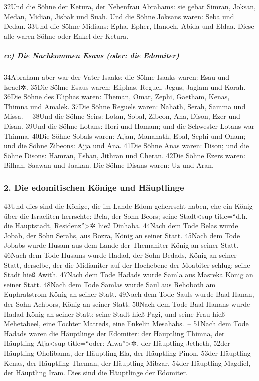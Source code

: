 32Und die Söhne der Ketura, der Nebenfrau Abrahams: sie gebar Simran,
Joksan, Medan, Midian, Jisbak und Suah. Und die Söhne Joksans waren:
Seba und Dedan. 33Und die Söhne Midians: Epha, Epher, Hanoch, Abida und
Eldaa. Diese alle waren Söhne oder Enkel der Ketura.

\hypertarget{cc-die-nachkommen-esaus-oder-die-edomiter}{%
\subparagraph{cc) Die Nachkommen Esaus (oder: die
Edomiter)}\label{cc-die-nachkommen-esaus-oder-die-edomiter}}

34Abraham aber war der Vater Isaaks; die Söhne Isaaks waren: Esau und
Israel✲. 35Die Söhne Esaus waren: Eliphas, Reguel, Jegus, Jaglam und
Korah. 36Die Söhne des Eliphas waren: Theman, Omar, Zephi, Gaetham,
Kenas, Thimna und Amalek. 37Die Söhne Reguels waren: Nahath, Serah,
Samma und Missa.~-- 38Und die Söhne Seirs: Lotan, Sobal, Zibeon, Ana,
Dison, Ezer und Disan. 39Und die Söhne Lotans: Hori und Homam; und die
Schwester Lotans war Thimna. 40Die Söhne Sobals waren: Aljan, Manahath,
Ebal, Sephi und Onam; und die Söhne Zibeons: Ajja und Ana. 41Die Söhne
Anas waren: Dison; und die Söhne Disons: Hamran, Esban, Jithran und
Cheran. 42Die Söhne Ezers waren: Bilhan, Saawan und Jaakan. Die Söhne
Disans waren: Uz und Aran.

\hypertarget{die-edomitischen-kuxf6nige-und-huxe4uptlinge}{%
\subsubsection{2. Die edomitischen Könige und
Häuptlinge}\label{die-edomitischen-kuxf6nige-und-huxe4uptlinge}}

43Und dies sind die Könige, die im Lande Edom geherrscht haben, ehe ein
König über die Israeliten herrschte: Bela, der Sohn Beors; seine
Stadt\textless sup title=``d.h. die Hauptstadt, Residenz''\textgreater✲
hieß Dinhaba. 44Nach dem Tode Belas wurde Jobab, der Sohn Serahs, aus
Bozra, König an seiner Statt. 45Nach dem Tode Jobabs wurde Husam aus dem
Lande der Themaniter König an seiner Statt. 46Nach dem Tode Husams wurde
Hadad, der Sohn Bedads, König an seiner Statt, derselbe, der die
Midianiter auf der Hochebene der Moabiter schlug; seine Stadt hieß
Awith. 47Nach dem Tode Hadads wurde Samla aus Masreka König an seiner
Statt. 48Nach dem Tode Samlas wurde Saul aus Rehoboth am Euphratstrom
König an seiner Statt. 49Nach dem Tode Sauls wurde Baal-Hanan, der Sohn
Achbors, König an seiner Statt. 50Nach dem Tode Baal-Hanans wurde Hadad
König an seiner Statt: seine Stadt hieß Pagi, und seine Frau hieß
Mehetabeel, eine Tochter Matreds, eine Enkelin Mesahabs.~-- 51Nach dem
Tode Hadads waren die Häuptlinge der Edomiter: der Häuptling Thimna, der
Häuptling Alja\textless sup title=``oder: Alwa''\textgreater✲, der
Häuptling Jetheth, 52der Häuptling Oholibama, der Häuptling Ela, der
Häuptling Pinon, 53der Häuptling Kenas, der Häuptling Theman, der
Häuptling Mibzar, 54der Häuptling Magdiel, der Häuptling Iram. Dies sind
die Häuptlinge der Edomiter.

